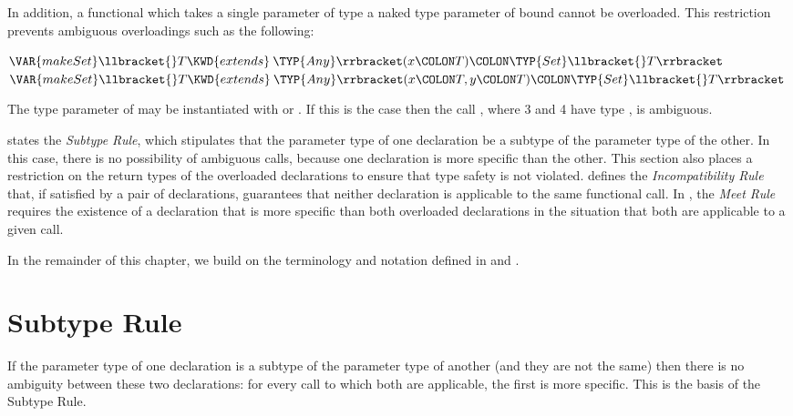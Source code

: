 In addition, a functional which takes a single parameter of type
a naked type parameter of bound  cannot be
overloaded.  This restriction prevents ambiguous overloadings such as
the following:
\begin{Fortress}
\(\VAR{makeSet}\llbracket{}T \KWD{extends}\mskip 4mu plus 4mu\TYP{Any}\rrbracket(x\COLON T)\COLON \TYP{Set}\llbracket{}T\rrbracket\)\\
\(\VAR{makeSet}\llbracket{}T \KWD{extends}\mskip 4mu plus 4mu\TYP{Any}\rrbracket(x\COLON T, y\COLON T)\COLON \TYP{Set}\llbracket{}T\rrbracket\)
\end{Fortress}
The type parameter of  may be instantiated with
 or .  If this is the
case then the call , where 3 and 4 have type
, is ambiguous.

 states the \emph{Subtype Rule}, which stipulates
that the parameter type of one declaration be a subtype of the
parameter type of the other.  In this case, there is no possibility of
ambiguous calls, because one declaration is more specific than the
other.  This section also places a restriction on the return types of
the overloaded declarations to ensure that type safety is not
violated.   defines the \emph{
Incompatibility Rule} that, if satisfied by a pair of declarations,
guarantees that neither declaration is applicable to the same
functional call.  In , the \emph{Meet Rule}
requires the existence of a declaration that is more specific than
both overloaded declarations in the situation that both are applicable
to a given call.

In the remainder of this chapter, we build on the terminology and
notation defined in 
and .



\section{Subtype Rule}

If the parameter type of one declaration is a subtype of the parameter
type of another (and they are not the same) then there is no
ambiguity between these two declarations: for every call to which both
are applicable, the first is more specific.  This is the basis of the
Subtype Rule.

